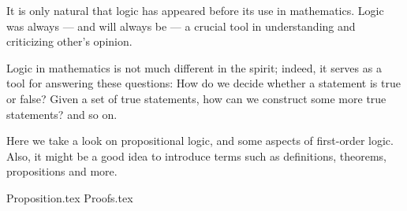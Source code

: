  \label{chap:logic}

It is only natural that
logic has appeared before its use in mathematics.
Logic was always
---
and will always be
---
a crucial tool in understanding and criticizing other's opinion.

Logic in mathematics is not much different in the spirit;
indeed, it serves as a tool for answering these questions:
How do we decide whether a statement is true or false?
Given a set of true statements,
how can we construct some more true statements?
and so on.

Here we take a look on propositional logic,
and some aspects of first-order logic.
Also, it might be a good idea to introduce terms
such as definitions, theorems, propositions and more.

{Proposition.tex}
{Proofs.tex}